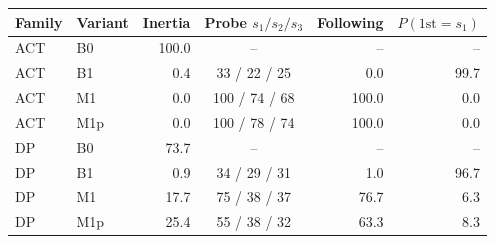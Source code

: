 \begin{tabular}{llrcrr}
\toprule
Family & Variant & Inertia & Probe $s_1/s_2/s_3$ & Following & $P(\text{1st}=s_1)$ \\
\midrule
ACT & B0 & 100.0 & -- & -- & -- \\
ACT & B1 & 0.4 & 33 / 22 / 25 & 0.0 & 99.7 \\
ACT & M1 & 0.0 & 100 / 74 / 68 & 100.0 & 0.0 \\
ACT & M1p & 0.0 & 100 / 78 / 74 & 100.0 & 0.0 \\
DP & B0 & 73.7 & -- & -- & -- \\
DP & B1 & 0.9 & 34 / 29 / 31 & 1.0 & 96.7 \\
DP & M1 & 17.7 & 75 / 38 / 37 & 76.7 & 6.3 \\
DP & M1p & 25.4 & 55 / 38 / 32 & 63.3 & 8.3 \\
\bottomrule
\end{tabular}
